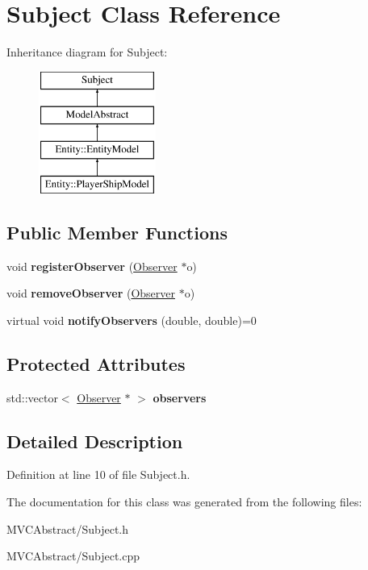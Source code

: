 \hypertarget{classSubject}{}\section{Subject Class Reference}
\label{classSubject}
Inheritance diagram for Subject\+:\begin{figure}[H]
\begin{center}
\leavevmode
\includegraphics[height=4.000000cm]{classSubject}
\end{center}
\end{figure}
\subsection*{Public Member Functions}
\begin{DoxyCompactItemize}
\item 
\mbox{\label{classSubject_abfcee03b33598243f896689b124c0f9e}} 
void {\bfseries register\+Observer} (\hyperlink{classObserver}{Observer} $\ast$o)
\item 
\mbox{\label{classSubject_a4a1c42acb74393e8458edb13be7e4b28}} 
void {\bfseries remove\+Observer} (\hyperlink{classObserver}{Observer} $\ast$o)
\item 
\mbox{\label{classSubject_aa21e68c3420b0dbbfdbff4f4f0f2e746}} 
virtual void {\bfseries notify\+Observers} (double, double)=0
\end{DoxyCompactItemize}
\subsection*{Protected Attributes}
\begin{DoxyCompactItemize}
\item 
\mbox{\label{classSubject_a39d24e695db0a792799b351dbebde992}} 
std\+::vector$<$ \hyperlink{classObserver}{Observer} $\ast$ $>$ {\bfseries observers}
\end{DoxyCompactItemize}


\subsection{Detailed Description}


Definition at line 10 of file Subject.\+h.



The documentation for this class was generated from the following files\+:\begin{DoxyCompactItemize}
\item 
M\+V\+C\+Abstract/Subject.\+h\item 
M\+V\+C\+Abstract/Subject.\+cpp\end{DoxyCompactItemize}
